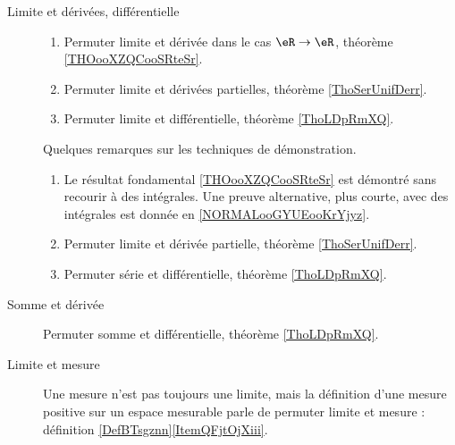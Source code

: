 \begin{description}
	\item[Limite et dérivées, différentielle]
		\begin{enumerate}
			\item
			      Permuter limite et dérivée dans le cas \( \eR\to \eR\), théorème \ref{THOooXZQCooSRteSr}.
			\item
			      Permuter limite et dérivées partielles, théorème \ref{ThoSerUnifDerr}.
			\item
			      Permuter limite et différentielle, théorème \ref{ThoLDpRmXQ}.
		\end{enumerate}
		Quelques remarques sur les techniques de démonstration.
		\begin{enumerate}
			\item
			      Le résultat fondamental \ref{THOooXZQCooSRteSr} est démontré sans recourir à des intégrales. Une preuve alternative, plus courte, avec des intégrales est donnée en \ref{NORMALooGYUEooKrYjyz}.
			\item
			      Permuter limite et dérivée partielle, théorème \ref{ThoSerUnifDerr}.
			\item
			      Permuter série et différentielle, théorème \ref{ThoLDpRmXQ}.
		\end{enumerate}
	\item[Somme et dérivée]
		Permuter somme et différentielle, théorème \ref{ThoLDpRmXQ}.
	\item[Limite et mesure]
		Une mesure n'est pas toujours une limite, mais la définition d'une mesure positive sur un espace mesurable parle de permuter limite et mesure : définition \ref{DefBTsgznn}\ref{ItemQFjtOjXiii}.
\end{description}
